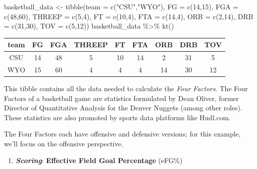 \documentclass[
  11pt,
]{book}
\newenvironment{Shaded}{\begin{snugshade}}{\end{snugshade}}
\newcommand{\AttributeTok}[1]{\textcolor[rgb]{0.77,0.63,0.00}{#1}}
\newcommand{\DecValTok}[1]{\textcolor[rgb]{0.00,0.00,0.81}{#1}}
\newcommand{\FunctionTok}[1]{\textcolor[rgb]{0.00,0.00,0.00}{#1}}
\newcommand{\NormalTok}[1]{#1}
\newcommand{\OtherTok}[1]{\textcolor[rgb]{0.56,0.35,0.01}{#1}}
\newcommand{\SpecialCharTok}[1]{\textcolor[rgb]{0.00,0.00,0.00}{#1}}
\newcommand{\StringTok}[1]{\textcolor[rgb]{0.31,0.60,0.02}{#1}}
\providecommand{\tightlist}{%
  \setlength{\itemsep}{0pt}\setlength{\parskip}{0pt}}
\theoremstyle{definition}
\theoremstyle{definition}
\theoremstyle{definition}
\theoremstyle{definition}
\theoremstyle{remark}
\begin{document}
\begin{Shaded}
\begin{Highlighting}[]
\NormalTok{basketball\_data }\OtherTok{\textless{}{-}} \FunctionTok{tibble}\NormalTok{(}\AttributeTok{team =} \FunctionTok{c}\NormalTok{(}\StringTok{"CSU"}\NormalTok{,}\StringTok{"WYO"}\NormalTok{), }\AttributeTok{FG =} \FunctionTok{c}\NormalTok{(}\DecValTok{14}\NormalTok{,}\DecValTok{15}\NormalTok{), }\AttributeTok{FGA =} \FunctionTok{c}\NormalTok{(}\DecValTok{48}\NormalTok{,}\DecValTok{60}\NormalTok{), }
                          \AttributeTok{THREEP =} \FunctionTok{c}\NormalTok{(}\DecValTok{5}\NormalTok{,}\DecValTok{4}\NormalTok{), }\AttributeTok{FT =} \FunctionTok{c}\NormalTok{(}\DecValTok{10}\NormalTok{,}\DecValTok{4}\NormalTok{), }\AttributeTok{FTA =} \FunctionTok{c}\NormalTok{(}\DecValTok{14}\NormalTok{,}\DecValTok{4}\NormalTok{), }
                          \AttributeTok{ORB =} \FunctionTok{c}\NormalTok{(}\DecValTok{2}\NormalTok{,}\DecValTok{14}\NormalTok{), }\AttributeTok{DRB =} \FunctionTok{c}\NormalTok{(}\DecValTok{31}\NormalTok{,}\DecValTok{30}\NormalTok{), }\AttributeTok{TOV =} \FunctionTok{c}\NormalTok{(}\DecValTok{5}\NormalTok{,}\DecValTok{12}\NormalTok{))}
\NormalTok{basketball\_data }\SpecialCharTok{\%\textgreater{}\%} \FunctionTok{kt}\NormalTok{()}
\end{Highlighting}
\end{Shaded}

\begin{table}[H]
\centering
\begin{tabular}{c|c|c|c|c|c|c|c|c}
\hline
team & FG & FGA & THREEP & FT & FTA & ORB & DRB & TOV\\
\hline
CSU & 14 & 48 & 5 & 10 & 14 & 2 & 31 & 5\\
\hline
WYO & 15 & 60 & 4 & 4 & 4 & 14 & 30 & 12\\
\hline
\end{tabular}
\end{table}

This tibble contains all the data needed to calculate the \emph{Four Factors}. The Four Factors of a basketball game are statistics formulated by Dean Oliver, former Director of Quantitative Analysis for the Denver Nuggets (among other roles). These statistics are also promoted by sports data platforms like Hudl.com.

The Four Factors each have offensive and defensive versions; for this example, we'll focus on the offensive perspective.

\begin{enumerate}
\def\labelenumi{\arabic{enumi}.}
\tightlist
\item
  \textbf{\emph{Scoring}}: \textbf{Effective Field Goal Percentage} (eFG\%)
\end{enumerate}
\end{document}
